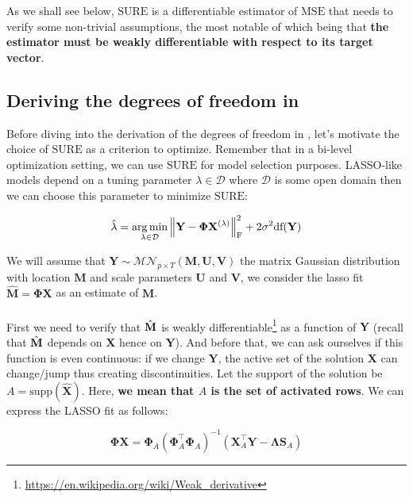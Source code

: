 \documentclass[a4paper,10pt]{article}
\theoremstyle{definition}
\begin{document}
As we shall see below, $\text{SURE}$ is a differentiable estimator of $\text{MSE}$ that needs to verify some
non-trivial assumptions, the most notable of which being that \textbf{the estimator must be weakly differentiable with
respect to its target vector}.

\subsection*{Deriving the degrees of freedom in }

Before diving into the derivation of the degrees of freedom in , let's motivate the choice of $\text{SURE}$ as a criterion
to optimize. Remember that in a bi-level optimization setting, we can use $\text{SURE}$ for model selection purposes. LASSO-like
models depend on a tuning parameter $\lambda \in \mathcal{D}$ where $\mathcal{D}$ is some open domain then we can choose this parameter to
minimize $\text{SURE}$:

\begin{equation*}
    \hat{\lambda} = \operatorname*{arg\,min}_{\lambda \in \mathcal{D}} \left \lVert  \mathbf{Y} - \mathbf{\Phi}\mathbf{X}^{(\lambda)} \right \rVert_{\text{F}}^2 + 2 \sigma^2 \text{df}(\bf{Y})
\end{equation*}

We will assume that $\mathbf{Y} \sim \mathcal{MN}_{p\times T}(\mathbf{M}, \mathbf{U}, \mathbf{V})$ the matrix Gaussian distribution with location $\mathbf{M}$
and scale parameters $\mathbf{U}$ and $\mathbf{V}$, we consider the lasso fit $\mathbf{\hat{M} = \Phi X}$ as an estimate of $\mathbf{M}$.
\\
\\
First we need to verify that $\hat{\bf{M}}$ is weakly differentiable\footnote{\url{https://en.wikipedia.org/wiki/Weak_derivative}} as a function of $\mathbf{Y}$
(recall that $\hat{\bf{M}}$ depends on $\mathbf{X}$ hence on $\mathbf{Y}$). And before that, we can ask ourselves if this function is even continuous: if
we change $\mathbf{Y}$, the active set of the solution $\mathbf{X}$ can change/jump thus creating discontinuities. Let the support of the solution be $A = \text{supp}(\hat{\mathbf{X}})$.
Here, \textbf{we mean that $A$ is the set of activated rows}.
\newpage
We can express the LASSO fit as follows:

\begin{equation*}
    \mathbf{\Phi X} = \mathbf{\Phi}_A(\mathbf{\Phi}_A^{\top}\mathbf{\Phi}_A)^{-1}(\mathbf{X}^{\top}_A\mathbf{Y} - \mathbf{\Lambda}\mathbf{S}_A)
\end{equation*}
\end{document}
